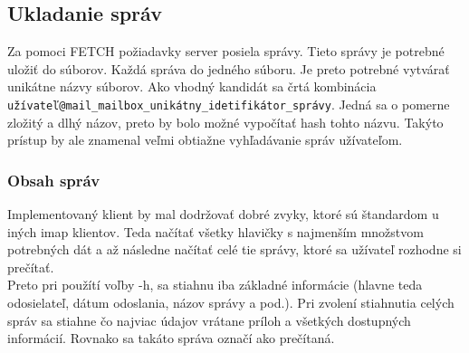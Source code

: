 \documentclass{article}
\begin{document}
\subsection{Ukladanie správ}
Za pomoci FETCH požiadavky server posiela správy. Tieto správy je potrebné uložiť do súborov. Každá správa do jedného súboru. Je preto potrebné vytvárať unikátne názvy súborov. Ako vhodný kandidát sa črtá kombinácia \texttt{užívateľ@mail\_mailbox\_unikátny\_idetifikátor\_správy}. Jedná sa o pomerne zložitý a dlhý názov, preto by bolo možné vypočítať hash tohto názvu. Takýto prístup by ale znamenal veľmi obtiažne vyhľadávanie správ užívateľom.\\
\subsubsection{Obsah správ}
Implementovaný klient by mal dodržovať dobré zvyky, ktoré sú štandardom u iných imap klientov. Teda načítať všetky hlavičky s najmenším množstvom potrebných dát a až následne načítať celé tie správy, ktoré sa užívateľ rozhodne si prečítať.\\
Preto pri použítí voľby -h,  sa stiahnu iba základné informácie (hlavne teda odosielateľ, dátum odoslania, názov správy a pod.). Pri zvolení stiahnutia celých správ sa stiahne čo najviac údajov vrátane príloh a všetkých dostupných informácií. Rovnako sa takáto správa označí ako prečítaná.
\end{document}
